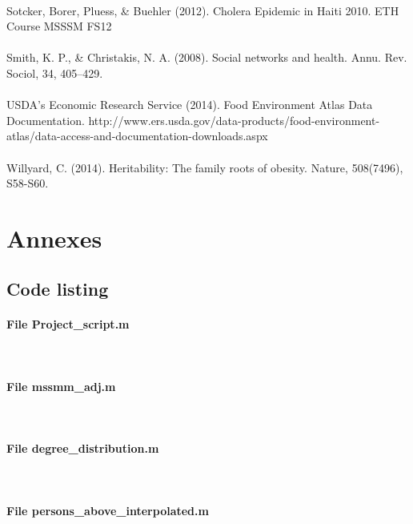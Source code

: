 \documentclass[11pt]{article}
\begin{document}
\paragraph{}
Sotcker, Borer, Pluess, \& Buehler (2012). Cholera Epidemic in Haiti 2010. ETH Course MSSSM FS12
\paragraph{}
Smith, K. P., \& Christakis, N. A. (2008). Social networks and health. Annu. Rev. Sociol, 34, 405–429.
\paragraph{}
USDA's Economic Research Service (2014). Food Environment Atlas Data Documentation. http://www.ers.usda.gov/data-products/food-environment-atlas/data-access-and-documentation-downloads.aspx
\paragraph{}
Willyard, C. (2014). Heritability: The family roots of obesity. Nature, 508(7496), S58-S60.




\newpage
\section{Annexes}
\subsection{Code listing}
\lstset{breaklines=true}

\paragraph{File Project\_script.m} \


\paragraph{File mssmm\_adj.m} \


\paragraph{File degree\_distribution.m} \


\paragraph{File persons\_above\_interpolated.m} \

\end{document}
